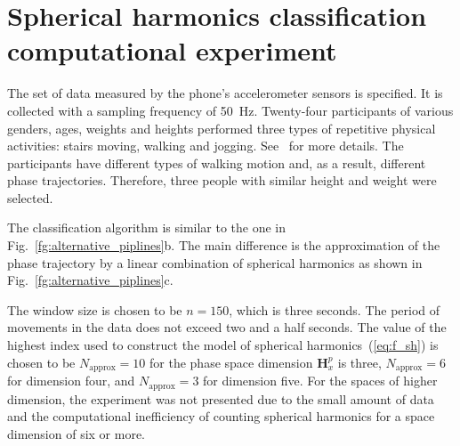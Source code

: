 \documentclass[12pt,twoside]{article}
\begin{document}
\section{Spherical harmonics classification computational experiment }

The set of data measured by the phone's accelerometer sensors is specified.
It is collected with a sampling frequency of 50~Hz.
Twenty-four participants of various genders, ages, weights and heights performed three types of repetitive physical activities: stairs moving, walking and jogging.
See~\cite{Malekzadeh_2018} for more details.
The participants have different types of walking motion and, as a result, different phase trajectories.
Therefore, three people with similar height and weight were selected.

The classification algorithm is similar to the one in Fig.~\ref{fg:alternative_piplines}b. The main difference is the approximation of the phase trajectory by a linear combination of spherical harmonics as shown in Fig.~\ref{fg:alternative_piplines}c.

The window size is chosen to be $n = 150$, which is three seconds.
The period of movements in the data does not exceed two and a half seconds.
The value of the highest index used to construct the model of spherical harmonics~(\ref{eq:f_sh}) is chosen to be $N_{\text{approx}} = 10$ for the phase space dimension $\mathbf{H}_{x}^ {p}$ is three, $N_{\text{approx}} = 6$ for dimension four, and $N_{\text{approx}} = 3$ for dimension five.
For the spaces of higher dimension, the experiment was not presented due to the small amount of data and the computational inefficiency of counting spherical harmonics for a space dimension of six or more.
\end{document}
